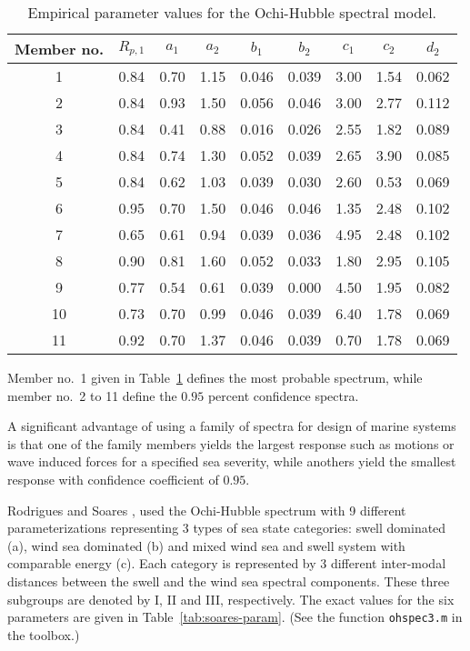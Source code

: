 \begin{table}[htbp]
  \begin{center}
    \begin{tabular}{| c | c c c c c c c c |} \hline \hline
Member no. & $R_{p,1}$ & $a_{1}$ & $a_{2}$ & $b_{1}$ & $b_{2}$ & $c_{1}$ & $c_{2}$ & $d_{2}$ \\ \hline
1  & 0.84 & 0.70 & 1.15 & 0.046 & 0.039 & 3.00 & 1.54 & 0.062 \\
2  & 0.84 & 0.93 & 1.50 & 0.056 & 0.046 & 3.00 & 2.77 & 0.112 \\
3  & 0.84 & 0.41 & 0.88 & 0.016 & 0.026 & 2.55 & 1.82 & 0.089 \\
4  & 0.84 & 0.74 & 1.30 & 0.052 & 0.039 & 2.65 & 3.90 & 0.085 \\
5  & 0.84 & 0.62 & 1.03 & 0.039 & 0.030 & 2.60 & 0.53 & 0.069 \\
6  & 0.95 & 0.70 & 1.50 & 0.046 & 0.046 & 1.35 & 2.48 & 0.102 \\
7  & 0.65 & 0.61 & 0.94 & 0.039 & 0.036 & 4.95 & 2.48 & 0.102 \\
8  & 0.90 & 0.81 & 1.60 & 0.052 & 0.033 & 1.80 & 2.95 & 0.105 \\
9  & 0.77 & 0.54 & 0.61 & 0.039 & 0.000 & 4.50 & 1.95 & 0.082 \\
10 & 0.73 & 0.70 & 0.99 & 0.046 & 0.039 & 6.40 & 1.78 & 0.069 \\
11 & 0.92 & 0.70 & 1.37 & 0.046 & 0.039 & 0.70 & 1.78 & 0.069 \\ \hline \hline
    \end{tabular}
    \caption[Empirical parameter values for the Ochi-Hubble spectral model]
{Empirical parameter values for the Ochi-Hubble spectral model.}
    \label{tab:oh-parameters}
  \end{center}
\end{table}
Member no.~1 given in Table~\ref{tab:oh-parameters} defines the most
  probable spectrum, while member no.~2 to 11 define the $0.95$ percent
  confidence spectra.

  A significant advantage of using a family of spectra for design  of
 marine systems is that one of the family members yields the largest
 response such as motions or wave induced forces for a specified sea
 severity, while anothers yield the smallest response with confidence
 coefficient of $0.95$.

Rodrigues and Soares
\cite{RodriguezAndSoares2000Wave}, used the Ochi-Hubble spectrum with
9 different parameterizations representing
 3 types of sea state categories: swell
dominated (a), wind sea dominated (b) and mixed wind sea and swell
system with comparable energy (c).
Each category is represented by 3 different inter-modal distances between
the swell and the wind sea spectral components.
These three subgroups are denoted by I, II and III, respectively.
The exact values for the six parameters  are given in
Table~\ref{tab:soares-param}. (See the function
\verb+ohspec3.m+ in the \progname{} toolbox.)


